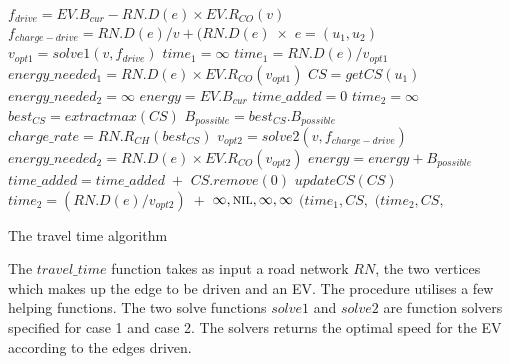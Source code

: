 \begin{algorithm}[!htb]
 \begin{algorithmic}[1]
    \State $f_{drive} = EV.B_{cur}-RN.D(e)\times EV.R_{CO}(v)$
    \State $f_{charge-drive} = RN.D(e)/v + (RN.D(e)\; \times$
  	\State $e = (u_1, u_2)$
  	\State $v_{opt1} = solve1(v, f_{drive})$
  		\State $time_1 = \infty$
  	\Else
 		\State $time_1 = RN.D(e) / v_{opt1}$
 		\State $energy\_needed_{1} = RN.D(e)\times EV.R_{CO}(v_{opt1})$
  	\EndIf
		\State $CS = getCS(u_1)$ 
  		\State $energy\_needed_{2} = \infty$
  		\State $energy = EV.B_{cur}$
  		\State $time\_added = 0$
  		\State $time_2 = \infty$
  		\State $best_{CS} = extractmax(CS)$
  		\State $B_{possible} = best_{CS}.B_{possible}$
  		\State $charge\_rate = RN.R_{CH}(best_{CS})$
  		\State $v_{opt2} = solve2 (v, f_{charge-drive})$ 
  		\State $energy\_needed_{2} = RN.D(e)\times EV.R_{CO}(v_{opt2})$
  		\State $energy = energy + B_{possible}$
  			\State $time\_added = time\_added\; +$
  			\State $CS.remove(0)$
  			\State $updateCS(CS)$
  		\EndIf	
  	\EndWhile
  		\State $time_2 = (RN.D(e)/v_{opt2})\; +$ 
  	\EndIf
  		\State \Return $\infty, \textsc{nil}, \infty, \infty$
  	\EndIf
  		\State \Return $(time_1, CS,$ 
  	\Else
  		\State \Return $(time_2, CS,$ 
  	\EndIf
  \EndFunction
  \end{algorithmic}\caption{The travel time algorithm}\label{alg:travel_time}
\end{algorithm}

The $travel\_time$ function takes as input a road network $RN$, the two vertices which makes up the edge to be driven and an EV. The procedure utilises a few helping functions. The two solve functions $solve1$ and $solve2$ are function solvers specified for case 1 and case 2. The solvers returns the optimal speed for the EV according to the edges driven. 

